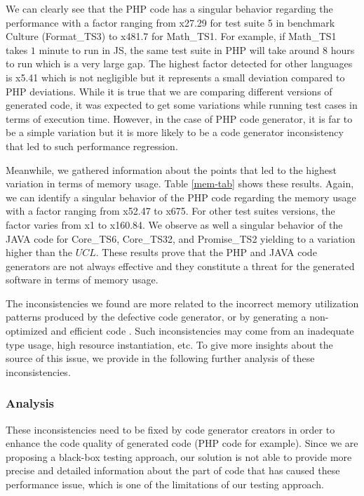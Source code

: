 We can clearly see that the PHP code has a singular behavior regarding the performance with a factor ranging from x27.29 for test suite 5 in benchmark Culture (Format\_TS3) to x481.7 for Math\_TS1. For example, if Math\_TS1 takes $1$ minute to run in JS, the same test suite in PHP will take around $8$ hours to run which is a very large gap. 
The highest factor detected for other languages is x5.41 which is not negligible but it represents a small deviation compared to PHP deviations. While it is true that we are comparing different versions of generated code, it was expected to get some variations while running test cases in terms of execution time. However, in the case of PHP code generator, it is far to be a simple variation but it is more likely to be a code generator inconsistency that led to such performance regression.


Meanwhile, we gathered information about the points that led to the highest variation in terms of memory usage. Table \ref{mem-tab} shows these results. 
Again, we can identify a singular behavior of the PHP code regarding the memory usage with a factor ranging from x52.47 to x675. For other test suites versions, the factor varies from x1 to x160.84. We observe as well a singular behavior of the JAVA code for Core\_TS6, Core\_TS32, and Promise\_TS2 yielding to a variation higher than the $UCL$. 
These results prove that the PHP and JAVA code generators are not always effective and they constitute a threat for the generated software in terms of memory usage.


The inconsistencies we found are more related to the incorrect memory utilization patterns produced by the defective code generator, or by generating a non-optimized and efficient code . Such inconsistencies may come from an inadequate type usage, high resource instantiation, etc.
To give more insights about the source of this issue, we provide in the following further analysis of these inconsistencies.



\subsubsection{Analysis}


These inconsistencies need to be fixed by code generator creators in order to enhance the code quality of generated code (PHP code for example). Since we are proposing a black-box testing approach, our solution is not able to provide more precise and detailed information about the part of code that has caused these performance issue, which is one of the limitations of our testing approach.

